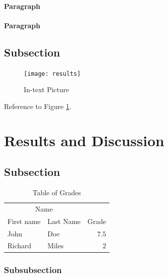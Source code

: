 \documentclass[fleqn,10pt]{SelfArx}
\begin{document}
\lipsum[6] %

\paragraph{Paragraph} \lipsum[7] %
\paragraph{Paragraph} \lipsum[8] %

\subsection{Subsection}

\lipsum[9] %

\begin{figure}[ht]\centering
	\texttt{[image: results]}
	\caption{In-text Picture}
	\label{fig:results}
\end{figure}

Reference to Figure \ref{fig:results}.


\section{Results and Discussion}

\lipsum[10] %

\subsection{Subsection}

\lipsum[11] %

\begin{table}[hbt]
	\caption{Table of Grades}
	\centering
	\begin{tabular}{llr}
		\toprule
		\multicolumn{2}{c}{Name} \\
		\cmidrule(r){1-2}
		First name & Last Name & Grade \\
		\midrule
		John & Doe & $7.5$ \\
		Richard & Miles & $2$ \\
		\bottomrule
	\end{tabular}
	\label{tab:label}
\end{table}

\subsubsection{Subsubsection}
\end{document}
